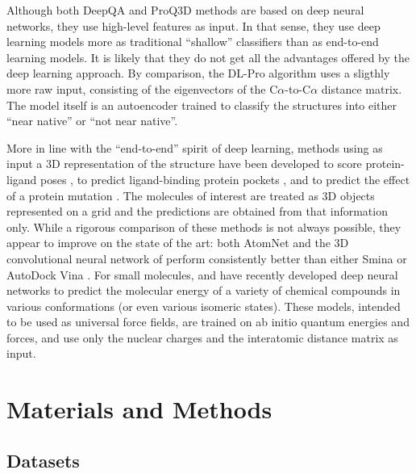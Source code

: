 \documentclass{bioinfo}
\begin{document}
Although both DeepQA and ProQ3D
methods are based on deep neural networks, they use high-level
features as input. In that sense, they use deep learning models more as
traditional ``shallow'' classifiers than as end-to-end learning
models. It is likely that they do not get all the advantages offered
by the deep learning approach.
By comparison, the DL-Pro algorithm \citep{nguyen2014dlpro} uses a
sligthly more raw input, consisting of the eigenvectors of the
C$\alpha$-to-C$\alpha$ distance matrix. The model itself is an
autoencoder \citep{hinton2006reducing} trained to classify the
structures into either ``near native'' or ``not near native''.

More in line with the ``end-to-end'' spirit of deep learning, methods
using as input a 3D representation of the structure have been
developed to score protein-ligand poses \citep{wallach2015atomnet,
ragoza2017protein}, to predict ligand-binding protein
pockets \citep{jimenez2017deepsite}, and to predict the effect of a
protein mutation \citep{torng2017}. The molecules of interest are
treated as 3D objects represented on a grid and the predictions are
obtained from that information only. While a rigorous comparison of
these methods is not always possible, they appear to
improve on the state of the art: both
AtomNet \citep{wallach2015atomnet} and the 3D convolutional neural
network of \citet{ragoza2017protein} perform
consistently better than either Smina \citep{koes2013smina} or AutoDock
Vina \citep{trott2009vina}.
For small molecules, \citet{schutt2017quantum,
schutt2017moleculenet} and \citet{smith2017ani1} have recently developed deep neural networks to predict
the molecular energy of a variety of chemical compounds in various
conformations (or even various isomeric states). These models,
intended to be used as universal force fields, are trained on ab
initio quantum energies and forces, and use only the nuclear charges and the
interatomic distance matrix as input.


\section{Materials and Methods}

\subsection{Datasets}
\end{document}
